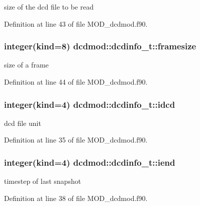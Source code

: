 size of the dcd file to be read 



Definition at line 43 of file M\-O\-D\-\_\-dcdmod.\-f90.

\hypertarget{structdcdmod_1_1dcdinfo__t_a605b9b04ee4d7576c261a19c9d6ed54d}{
\subsubsection[{framesize}]{\setlength{\rightskip}{0pt plus 5cm}integer(kind=8) dcdmod\-::dcdinfo\-\_\-t\-::framesize}}\label{structdcdmod_1_1dcdinfo__t_a605b9b04ee4d7576c261a19c9d6ed54d}


size of a frame 



Definition at line 44 of file M\-O\-D\-\_\-dcdmod.\-f90.

\hypertarget{structdcdmod_1_1dcdinfo__t_ab9f61d86ef4bf3d09888abddaa3c1fd7}{
\subsubsection[{idcd}]{\setlength{\rightskip}{0pt plus 5cm}integer(kind=4) dcdmod\-::dcdinfo\-\_\-t\-::idcd}}\label{structdcdmod_1_1dcdinfo__t_ab9f61d86ef4bf3d09888abddaa3c1fd7}


dcd file unit 



Definition at line 35 of file M\-O\-D\-\_\-dcdmod.\-f90.

\hypertarget{structdcdmod_1_1dcdinfo__t_acf96acb569660c2986d1956f4cc7b1df}{
\subsubsection[{iend}]{\setlength{\rightskip}{0pt plus 5cm}integer(kind=4) dcdmod\-::dcdinfo\-\_\-t\-::iend}}\label{structdcdmod_1_1dcdinfo__t_acf96acb569660c2986d1956f4cc7b1df}


timestep of last snapshot 



Definition at line 38 of file M\-O\-D\-\_\-dcdmod.\-f90.


